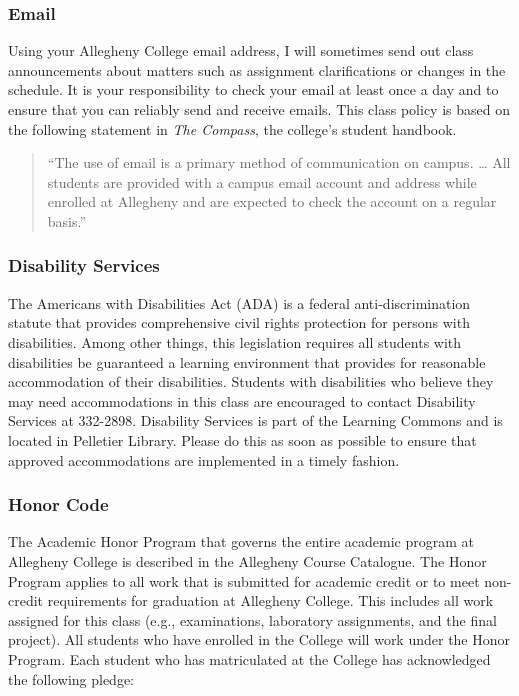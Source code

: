 \subsubsection*{Email}

Using your Allegheny College email address, I will sometimes send out class announcements about matters such as
assignment clarifications or changes in the schedule. It is your responsibility to check your email at least once a day
and to ensure that you can reliably send and receive emails. This class policy is based on the following statement in
{\em The Compass}, the college's student handbook.

\newpage
\begin{quote}
``The use of email is a primary method of communication on campus. \ldots
All students are provided with a campus email account and address while
enrolled at Allegheny and are expected to check the account on a regular
basis.'' 
\end{quote}
\vspace*{-.15in}

\subsubsection*{Disability Services}

The Americans with Disabilities Act (ADA) is a federal anti-discrimination statute that provides comprehensive civil
rights protection for persons with disabilities.  Among other things, this legislation requires all students with
disabilities be guaranteed a learning environment that provides for reasonable accommodation of their disabilities.
Students with disabilities who believe they may need accommodations in this class are encouraged to contact Disability
Services at 332-2898.  Disability Services is part of the Learning Commons and is located in Pelletier Library.
Please do this as soon as possible to ensure that approved accommodations are implemented in a timely fashion.

\subsubsection*{Honor Code}

The Academic Honor Program that governs the entire academic program at Allegheny College is described in the Allegheny
Course Catalogue.  The Honor Program applies to all work that is submitted for academic credit or to meet non-credit
requirements for graduation at Allegheny College.  This includes all work assigned for this class (e.g., examinations,
laboratory assignments, and the final project).  All students who have enrolled in the College will work under the Honor
Program.  Each student who has matriculated at the College has acknowledged the following pledge:

